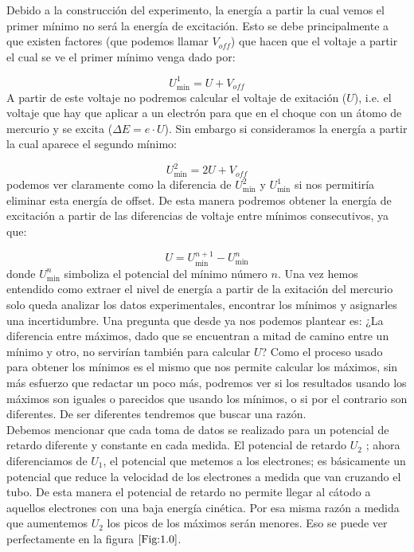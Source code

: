 \documentclass[12pt,a4paper]{article}
\numberwithin{equation}{section}
\numberwithin{figure}{section}
\begin{document}
Debido a la construcción del experimento, la energía a partir la cual vemos el primer mínimo no será la energía de excitación. Esto se debe principalmente a que existen factores (que podemos llamar $V_{off}$) que hacen que el voltaje a partir el cual se ve el primer mínimo venga dado por:

\begin{equation}
U_{\min}^{1}  = U + V_{off}
\end{equation}
A partir de este voltaje no podremos calcular el voltaje de exitación ($U$), i.e. el voltaje que hay que aplicar a un electrón para que en el choque con un átomo de mercurio y se excita ($\Delta E = e \cdot U$). Sin embargo si consideramos la energía a partir la cual aparece el segundo mínimo:

\begin{equation}
U_{\min}^{2} = 2U + V_{off}
\end{equation}
podemos ver claramente como la diferencia de $U_{\min}^{2}$ y $U_{\min}^{1}$ si nos permitiría eliminar esta energía de offset. De esta manera podremos obtener la energía de excitación a partir de las diferencias de voltaje entre mínimos consecutivos, ya que:

\begin{equation}
U = U_{\min}^{n+1} - U_{\min}^{n} 
\end{equation}
donde $U_{\min}^{n}$ simboliza el potencial del mínimo número $n$. Una vez hemos entendido como extraer el nivel de energía a partir de la exitación del mercurio solo queda analizar los datos experimentales, encontrar los mínimos y asignarles una incertidumbre. Una pregunta que desde ya nos podemos plantear es: ¿La diferencia entre máximos, dado que se encuentran a mitad de camino entre un mínimo y otro, no servirían también para calcular $U$? Como el proceso usado para obtener los mínimos es el mismo  que nos permite calcular los máximos, sin más esfuerzo que redactar un poco más, podremos ver si los resultados usando los máximos son iguales o parecidos que usando los mínimos, o si por el contrario son diferentes. De ser diferentes tendremos que buscar una razón. \\

Debemos mencionar que cada toma de datos se realizado para un potencial de retardo diferente y constante en cada medida. El potencial de retardo $U_2$ ; ahora diferenciamos de $U_1$, el potencial que metemos a los electrones; es básicamente un potencial que reduce la velocidad de los electrones a medida que van cruzando el tubo. De esta manera el potencial de retardo no permite llegar al cátodo a aquellos electrones con una baja energía cinética. Por esa misma razón a medida que aumentemos $U_2$ los picos de los máximos serán  menores. Eso se puede ver perfectamente en la figura $\ref{Fig:1.0}$. 
\end{document}
